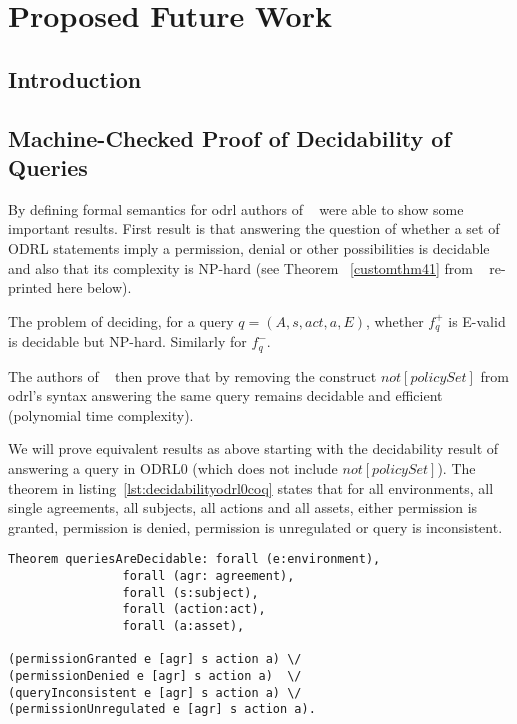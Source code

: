 \chapter{Proposed Future Work}

\section{Introduction}


\section{Machine-Checked Proof of Decidability of Queries}

By defining formal semantics for \ac{odrl} authors of ~\cite{pucella2006} were able to show some important results. First result is that answering the question of whether a set of ODRL statements imply a permission, denial or other possibilities is decidable and also that its complexity is NP-hard (see Theorem ~\ref{customthm41} from ~\cite{pucella2006} re-printed here below).

\begin{customthm}{4.1}\label{customthm41}
The problem of deciding, for a query $q = (A, s, act, a, E)$, whether $f^{+}_q$ is E-valid is decidable but NP-hard. Similarly for $f^{-}_q$.
\end{customthm}

The authors of ~\cite{pucella2006} then prove that by removing the construct $not[policySet]$ from \ac{odrl}'s syntax answering the same query remains decidable and efficient (polynomial time complexity). 

We will prove equivalent results as above starting with the decidability result of answering a query in ODRL0 (which does not include $not[policySet]$). The theorem in listing~\ref{lst:decidabilityodrl0coq} states that for all environments, all single agreements, all subjects, all actions and all assets, either permission is granted, permission is denied, permission is unregulated or query is inconsistent. 

\begin{minipage}[c]{0.95\textwidth}
\begin{lstlisting}
Theorem queriesAreDecidable: forall (e:environment), 
                forall (agr: agreement),
                forall (s:subject),
                forall (action:act),
                forall (a:asset),

(permissionGranted e [agr] s action a) \/
(permissionDenied e [agr] s action a)  \/
(queryInconsistent e [agr] s action a) \/
(permissionUnregulated e [agr] s action a).

\end{lstlisting}
\end{minipage}

